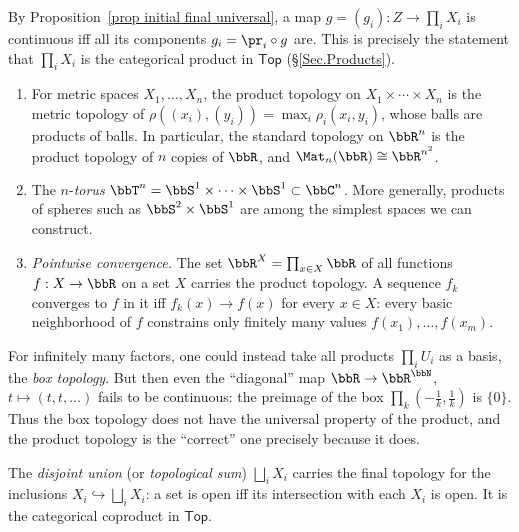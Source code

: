 By Proposition~\ref{prop initial final universal}, a map $g=(g_i):Z\to\prod_iX_i$ is continuous iff all its components $g_i=\pr_i\circ g$ are. This is precisely the statement that $\prod_iX_i$ is the categorical product in $\mathsf{Top}$ (\S\ref{Sec.Products}).

\begin{example}\label{example products}
    \begin{enumerate}
        \item For metric spaces $X_1,\ldots,X_n$, the product topology on $X_1\times\cdots\times X_n$ is the metric topology of $\rho((x_i),(y_i))=\max_i\rho_i(x_i,y_i)$, whose balls are products of balls. In particular, the standard topology on $\bbR^n$ is the product topology of $n$ copies of $\bbR$, and $\Mat_n(\bbR)\cong\bbR^{n^2}$.
        \item The $n$-\emph{torus} $\bbT^n=\bbS^1\times\cdots\times\bbS^1\subset\bbC^n$. More generally, products of spheres such as $\bbS^2\times\bbS^1$ are among the simplest spaces we can construct.
        \item \emph{Pointwise convergence.} The set $\bbR^X=\prod_{x\in X}\bbR$ of all functions $f:X\to\bbR$ on a set $X$ carries the product topology. A sequence $f_k$ converges to $f$ in it iff $f_k(x)\to f(x)$ for every $x\in X$: every basic neighborhood of $f$ constrains only finitely many values $f(x_1),\ldots,f(x_m)$.
    \end{enumerate}
\end{example}

\begin{rem}
    For infinitely many factors, one could instead take all products $\prod_iU_i$ as a basis, the \emph{box topology}. But then even the ``diagonal'' map $\bbR\to\bbR^\bbN$, $t\mapsto(t,t,\ldots)$ fails to be continuous: the preimage of the box $\prod_k(-\frac1k,\frac1k)$ is $\{0\}$. Thus the box topology does not have the universal property of the product, and the product topology is the ``correct'' one precisely because it does.
\end{rem}

\begin{defn}
    The \emph{disjoint union} (or \emph{topological sum}) $\bigsqcup_iX_i$ carries the final topology for the inclusions $X_i\hookrightarrow\bigsqcup_iX_i$: a set is open iff its intersection with each $X_i$ is open. It is the categorical coproduct in $\mathsf{Top}$.
\end{defn}

